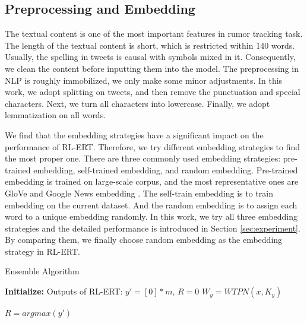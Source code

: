 \subsection{Preprocessing and Embedding}
\label{sec:process_embedding}
The textual content is one of the most important features in rumor tracking task. The length of the textual content is short, which is restricted within 140 words. Usually, the spelling in tweets is causal with symbols mixed in it. Consequently, we clean the content before inputting them into the model. The preprocessing in NLP is roughly immobilized, we only make some minor adjustments. In this work, we adopt splitting on tweets, and then remove the punctuation and special characters. Next, we turn all characters into lowercase. Finally, we adopt lemmatization on all words.

We find that the embedding strategies have a significant impact on the performance of RL-ERT. Therefore, we try different embedding strategies to find the most proper one. There are three commonly used embedding strategies: pre-trained embedding, self-trained embedding, and random embedding. Pre-trained embedding is trained on large-scale corpus, and the most representative ones are GloVe \cite{DBLP:conf/emnlp/PenningtonSM14} and Google News embedding \cite{googlenews}. The self-train embedding is to train embedding on the current dataset. And the random embedding is to assign each word to a unique embedding randomly. In this work, we try all three embedding strategies and the detailed performance is introduced in Section \ref{sec:experiment}. By comparing them, we finally choose random embedding as the embedding strategy in RL-ERT.

\begin{algorithm}[tbp]
	\caption{Ensemble Algorithm}
	\label{algorithm:RL-BRT}
	\LinesNumbered %
	\textbf{Initialize:} Outputs of RL-ERT: $y' = [0]*m$, $R = 0$ \;
	$W_y =  WTPN(x, K_y)$ \;
	
	$R = argmax(y')$
\end{algorithm}

